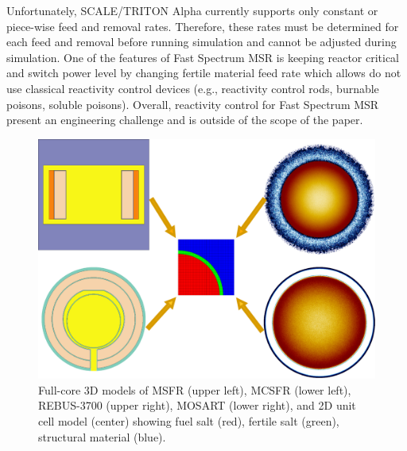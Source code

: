 \documentclass{anstrans}
\begin{document}
Unfortunately, SCALE/TRITON Alpha currently supports only constant or piece-wise feed and removal rates. Therefore, these rates must be determined for each feed and removal before running simulation and cannot be adjusted during simulation. One of the features of Fast Spectrum \gls{MSR} is keeping reactor critical and switch power level by changing fertile material feed rate which allows do not use classical reactivity control devices (e.g., reactivity control rods, burnable poisons, soluble poisons). Overall, reactivity control for Fast Spectrum \gls{MSR} present an engineering challenge and is outside of the scope of the paper.
\begin{figure}[!htb]
  \centering
  \includegraphics[scale=0.265]{./Figures/fsmsrs.pdf}
  \caption{Full-core 3D models of \gls{MSFR} (upper left), \gls{MCSFR} (lower left), REBUS-3700 (upper right), \gls{MOSART} (lower right), and 2D unit cell model (center) showing fuel salt (red), fertile salt (green), structural material (blue).}  
  \vspace{-0.15in}
  \label{fig:unit_cell}
\end{figure}
\end{document}
